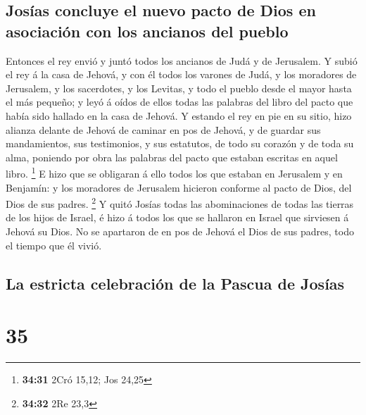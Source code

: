 \hypertarget{josuxedas-concluye-el-nuevo-pacto-de-dios-en-asociaciuxf3n-con-los-ancianos-del-pueblo}{%
\subsection{Josías concluye el nuevo pacto de Dios en asociación con los
ancianos del
pueblo}\label{josuxedas-concluye-el-nuevo-pacto-de-dios-en-asociaciuxf3n-con-los-ancianos-del-pueblo}}

 Entonces el rey envió y juntó todos los ancianos de Judá
y de Jerusalem.  Y subió el rey á la casa de Jehová, y
con él todos los varones de Judá, y los moradores de Jerusalem, y los
sacerdotes, y los Levitas, y todo el pueblo desde el mayor hasta el más
pequeño; y leyó á oídos de ellos todas las palabras del libro del pacto
que había sido hallado en la casa de Jehová.  Y estando
el rey en pie en su sitio, hizo alianza delante de Jehová de caminar en
pos de Jehová, y de guardar sus mandamientos, sus testimonios, y sus
estatutos, de todo su corazón y de toda su alma, poniendo por obra las
palabras del pacto que estaban escritas en aquel libro. \footnote{\textbf{34:31}
  2Cró 15,12; Jos 24,25}  E hizo que se obligaran á ello
todos los que estaban en Jerusalem y en Benjamín: y los moradores de
Jerusalem hicieron conforme al pacto de Dios, del Dios de sus padres.
\footnote{\textbf{34:32} 2Re 23,3}  Y quitó Josías todas
las abominaciones de todas las tierras de los hijos de Israel, é hizo á
todos los que se hallaron en Israel que sirviesen á Jehová su Dios. No
se apartaron de en pos de Jehová el Dios de sus padres, todo el tiempo
que él vivió.

\hypertarget{la-estricta-celebraciuxf3n-de-la-pascua-de-josuxedas}{%
\subsection{La estricta celebración de la Pascua de
Josías}\label{la-estricta-celebraciuxf3n-de-la-pascua-de-josuxedas}}

\hypertarget{section-34}{%
\section{35}\label{section-34}}

